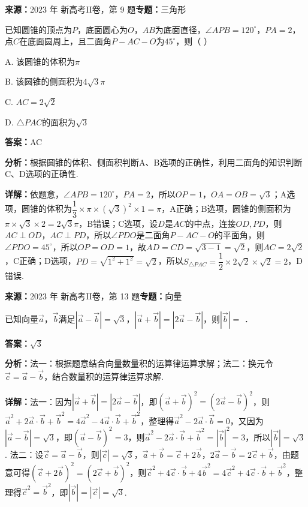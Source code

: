 \begin{question}[points=5]
\textbf{来源：}2023 年 新高考II卷，第 9 题\quad \textbf{专题：}三角形\par
已知圆锥的顶点为$P$，底面圆心为$O$，$AB$为底面直径，$\angle APB=120^{\circ}$，$PA=2$，点$C$在底面圆周上，且二面角$P-AC-O$为$45^{\circ}$，则（ \quad ）
\begin{choices}
  \item A. 该圆锥的体积为$\pi$
  \item B. 该圆锥的侧面积为$4\sqrt{3}\pi$
  \item C. $AC=2\sqrt{2}$
  \item D. $\triangle PAC$的面积为$\sqrt{3}$
\end{choices}
\begin{solution}
\textbf{答案：}AC

\textbf{分析：}根据圆锥的体积、侧面积判断A、B选项的正确性，利用二面角的知识判断C、D选项的正确性.

\textbf{详解：}依题意，$\angle APB=120^{\circ}$，$PA=2$，所以$OP=1$，$OA=OB=\sqrt{3}$；A选项，圆锥的体积为$\dfrac{1}{3}\times\pi\times(\sqrt{3})^{2}\times1=\pi$，A正确；B选项，圆锥的侧面积为$\pi\times\sqrt{3}\times2=2\sqrt{3}\pi$，B错误；C选项，设$D$是$AC$的中点，连接$OD,PD$，则$AC\perp OD$，$AC\perp PD$，所以$\angle PDO$是二面角$P-AC-O$的平面角，则$\angle PDO=45^{\circ}$，所以$OP=OD=1$，故$AD=CD=\sqrt{3-1}=\sqrt{2}$，则$AC=2\sqrt{2}$，C正确；D选项，$PD=\sqrt{1^{2}+1^{2}}=\sqrt{2}$，所以$S_{\triangle PAC}=\dfrac{1}{2}\times2\sqrt{2}\times\sqrt{2}=2$，D错误.
\end{solution}
\end{question}

\begin{question}[points=5]
\textbf{来源：}2023 年 新高考II卷，第 13 题\quad \textbf{专题：}向量\par
已知向量$\vec{a}$，$\vec{b}$满足$|\vec{a}-\vec{b}|=\sqrt{3}$，$|\vec{a}+\vec{b}|=|2\vec{a}-\vec{b}|$，则$|\vec{b}|=$ ．
\fillin[{$\sqrt{3}$}]
\begin{solution}
\textbf{答案：}$\sqrt{3}$

\textbf{分析：}法一：根据题意结合向量数量积的运算律运算求解；法二：换元令$\vec{c}=\vec{a}-\vec{b}$，结合数量积的运算律运算求解.

\textbf{详解：}法一：因为$|\vec{a}+\vec{b}|=|2\vec{a}-\vec{b}|$，即$(\vec{a}+\vec{b})^{2}=(2\vec{a}-\vec{b})^{2}$，则$\vec{a}^{2}+2\vec{a}\cdot\vec{b}+\vec{b}^{2}=4\vec{a}^{2}-4\vec{a}\cdot\vec{b}+\vec{b}^{2}$，整理得$\vec{a}^{2}-2\vec{a}\cdot\vec{b}=0$，又因为$|\vec{a}-\vec{b}|=\sqrt{3}$，即$(\vec{a}-\vec{b})^{2}=3$，则$\vec{a}^{2}-2\vec{a}\cdot\vec{b}+\vec{b}^{2}=|\vec{b}|^{2}=3$，所以$|\vec{b}|=\sqrt{3}$.
法二：设$\vec{c}=\vec{a}-\vec{b}$，则$|\vec{c}|=\sqrt{3}$，$\vec{a}+\vec{b}=\vec{c}+2\vec{b}$，$2\vec{a}-\vec{b}=2\vec{c}+\vec{b}$，由题意可得$(\vec{c}+2\vec{b})^{2}=(2\vec{c}+\vec{b})^{2}$，则$\vec{c}^{2}+4\vec{c}\cdot\vec{b}+4\vec{b}^{2}=4\vec{c}^{2}+4\vec{c}\cdot\vec{b}+\vec{b}^{2}$，整理得$\vec{c}^{2}=\vec{b}^{2}$，即$|\vec{b}|=|\vec{c}|=\sqrt{3}$.
\end{solution}
\end{question}

